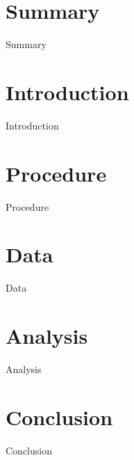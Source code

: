 \documentclass[12pt,a4paper]{article}
\begin{document}
    \tableofcontents
    \section{Summary}
        {Summary}
    \section{Introduction}
        {Introduction}
    \section{Procedure}
        {Procedure}
    \section{Data}
	    {Data}
    \section{Analysis}
		{Analysis}
    \section{Conclusion}
	    {Conclusion}
\end{document}
